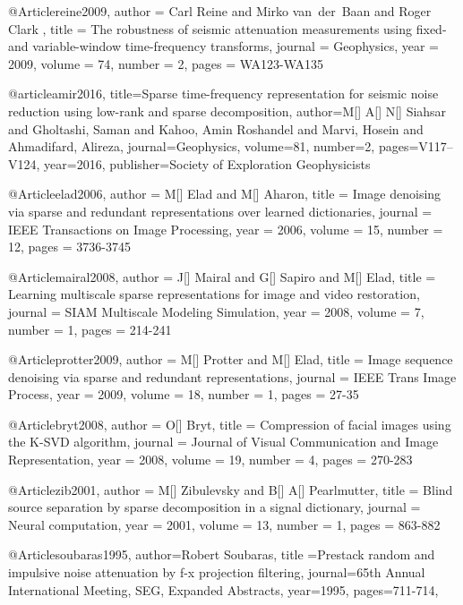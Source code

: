 {@Article{reine2009,
  author = 	 {Carl Reine and Mirko van~der~Baan and Roger Clark },
  title = 	 {The robustness of seismic attenuation measurements using fixed- and variable-window time-frequency transforms},
  journal = 	 {Geophysics},
  year = 	 2009,
  volume = 	 74,
  number = 	 2,
  pages = 	 {WA123-WA135}}


@article{amir2016,
  title={Sparse time-frequency representation for seismic noise reduction using low-rank and sparse decomposition},
  author={M[] A[] N[] Siahsar and Gholtashi, Saman and Kahoo, Amin Roshandel and Marvi, Hosein and Ahmadifard, Alireza},
  journal={Geophysics},
  volume={81},
  number={2},
  pages={V117--V124},
  year={2016},
  publisher={Society of Exploration Geophysicists}
}

@Article{elad2006,
  author = 	 {M[] Elad and M[] Aharon},
  title = 	 {Image denoising via sparse and redundant representations over learned dictionaries},
  journal = 	 {IEEE Transactions on Image Processing},
  year = 	 2006,
  volume = 	 15,
  number = 	 12,
  pages = 	 {3736-3745}}

@Article{mairal2008,
  author = 	 {J[] Mairal and G[] Sapiro and M[] Elad},
  title = 	 {Learning multiscale sparse representations for image and video restoration},
  journal = 	 {SIAM Multiscale Modeling Simulation},
  year = 	 2008,
  volume = 	 7,
  number = 	 1,
  pages = 	 {214-241}}


@Article{protter2009,
  author = 	 {M[] Protter and M[] Elad},
  title = 	 {Image sequence denoising via sparse and redundant representations},
  journal = 	 {IEEE Trans Image Process},
  year = 	 2009,
  volume = 	 18,
  number = 	 1,
  pages = 	 {27-35}}

@Article{bryt2008,
  author = 	 {O[] Bryt},
  title = 	 {Compression of facial images using the {K}-{SVD} algorithm},
  journal = 	 {Journal of Visual Communication and Image Representation},
  year = 	 2008,
  volume = 	 19,
  number = 	 4,
  pages = 	 {270-283}}

@Article{zib2001,
  author = 	 {M[] Zibulevsky and B[] A[] Pearlmutter},
  title = 	 {Blind source separation by sparse decomposition in a signal dictionary},
  journal = 	 {Neural computation},
  year = 	 2001,
  volume = 	 13,
  number = 	 1,
  pages = 	 {863-882}}

@Article{soubaras1995,
  author={Robert Soubaras},
  title ={Prestack random and impulsive noise attenuation by f-x projection filtering},
  journal={65th Annual International Meeting, SEG, Expanded Abstracts},
  year=1995,
  pages={711-714},
}

}
